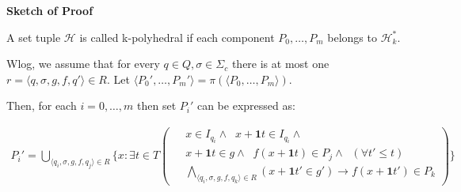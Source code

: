 \documentclass[table]{beamer}
\begin{document}
\begin{frame}
	\textbf{Sketch of Proof}
	
	\medskip

	A set tuple $\mathcal{H}$ is called k-polyhedral if each component $P_0,\ldots,P_m$ belongs to $\mathcal{H}^*_k$.

	\medskip

	Wlog, we assume that for every $q \in Q,\sigma \in \Sigma_c$ there is at most one $r=\langle q,\sigma,g,f,q'\rangle \in R$. Let $\langle P_0', \ldots, P_m'\rangle = \pi(\langle P_0, \ldots, P_m\rangle)$.
	
	\medskip

	Then, for each $i=0,\ldots,m$ then set $P_i'$ can be expressed as:

	\noindent 
	\begin{adjustbox}{max width=\textwidth}
	\parbox{\linewidth}{%
		\begin{align*}
			P_i' = \bigcup_{\langle q_i,\sigma,g,f,q_j\rangle \in R} \{x : \exists t \in T \left (
			\begin{aligned}
				\;&x \in I_{q_i} \land\;\;x+\textbf{1}t \in I_{q_i} \land\\ 
				\;&x+\textbf{1}t \in g \land\;\;f(x+\textbf{1}t) \in P_j \land \;\; (\forall t' \leq t)\\
				\;&\bigwedge_{\langle q_i,\sigma,g,f,q_k\rangle \in R}(x+\textbf{1}t' \in g')\rightarrow f(x+\textbf{1}t')\in P_k
			\end{aligned} \right ) \}
		\end{align*}
	}
	\end{adjustbox}
\end{frame}
\end{document}
